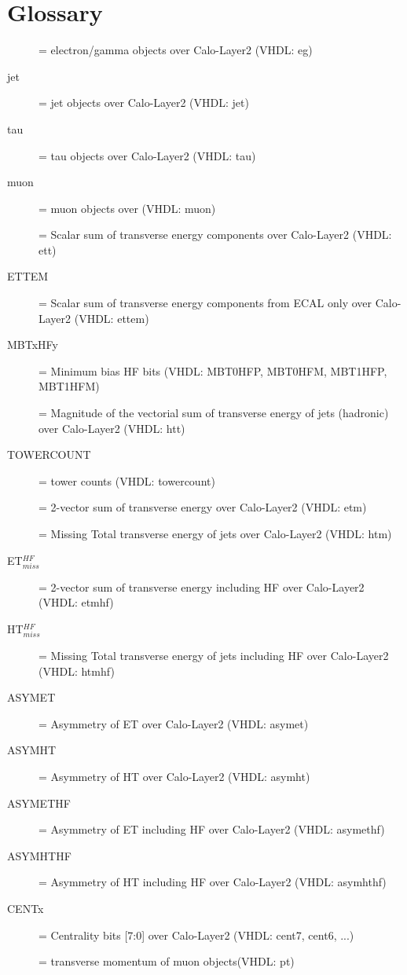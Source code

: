 \section{Glossary}\label{sec:glossary}

\begin{description}
\item [{\egamma}] = electron/gamma objects over Calo-Layer2 (VHDL: eg)
\item [{jet}] = jet objects over Calo-Layer2 (VHDL: jet)
\item [{tau}] = tau objects over Calo-Layer2 (VHDL: tau)
\item [{muon}] = muon objects over \ugmt (VHDL: muon)
\item [{\ett}] = Scalar sum of transverse energy components over Calo-Layer2 (VHDL: ett)
\item [{ETTEM}] = Scalar sum of transverse energy components from ECAL only over Calo-Layer2 (VHDL: ettem)
\item [{MBTxHFy}] = Minimum bias HF bits (VHDL: MBT0HFP, MBT0HFM, MBT1HFP, MBT1HFM)
\item [{\htt}] = Magnitude of the vectorial sum of transverse energy of jets (hadronic) over Calo-Layer2 (VHDL: htt)
\item [{TOWERCOUNT}] = tower counts (VHDL: towercount)
\item [{\etm}] = 2-vector sum of transverse energy over Calo-Layer2 (VHDL: etm)
\item [{\htm}] = Missing Total transverse energy of jets over Calo-Layer2 (VHDL: htm)
\item [{ET$_{miss}^{HF}$}] = 2-vector sum of transverse energy including HF over Calo-Layer2 (VHDL: etmhf)
\item [{HT$_{miss}^{HF}$}] = Missing Total transverse energy of jets including HF over Calo-Layer2 (VHDL: htmhf)
\item [{ASYMET}] = Asymmetry of ET over Calo-Layer2 (VHDL: asymet)
\item [{ASYMHT}] = Asymmetry of HT over Calo-Layer2 (VHDL: asymht)
\item [{ASYMETHF}] = Asymmetry of ET including HF over Calo-Layer2 (VHDL: asymethf)
\item [{ASYMHTHF}] = Asymmetry of HT including HF over Calo-Layer2 (VHDL: asymhthf)
\item [{CENTx}] = Centrality bits [7:0] over Calo-Layer2 (VHDL: cent7, cent6, ...)
\item [{\pt}] = transverse momentum of muon objects(VHDL: pt)

\end{description}
